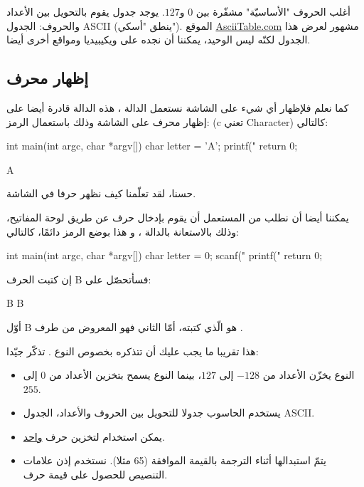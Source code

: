 أغلب الحروف "الأساسيّة" مشفّرة بين $0$ و$127$. يوجد جدول يقوم بالتحويل بين الأعداد والحروف: الجدول
\textenglish{ASCII}
(ينطق "أسكي"). الموقع
\href{http://www.asciitable.com/}{\textenglish{AsciiTable.com}}
مشهور لعرض هذا الجدول لكنّه ليس الوحيد، يمكننا أن نجده على ويكيبيديا ومواقع أخرى أيضا.

\subsection{إظهار محرف}

كما نعلم فلإظهار أي شيء على الشاشة نستعمل الدالة
،
هذه الدالة قادرة أيضا على إظهار محرف على الشاشة وذلك باستعمال الرمز:
(\textenglish{c} تعني \textenglish{Character})
كالتالي:

\begin{Csource}
int main(int argc, char *argv[])
{
	char letter = 'A';
	printf("%
	return 0;
}
\end{Csource}

\begin{Console}
A
\end{Console}

حسنا، لقد تعلّمنا كيف نظهر حرفا في الشاشة.

يمكننا أيضا أن نطلب من المستعمل أن يقوم بإدخال حرف عن طريق لوحة المفاتيح، وذلك بالاستعانة بالدالة
،
و هذا بوضع الرمز
دائمًا، كالتالي:

\begin{Csource}
int main(int argc, char *argv[])
{
	char letter = 0;
	scanf("%
	printf("%
	return 0;
}
\end{Csource}

إن كتبت الحرف
\textenglish{B}
فسأتحصّل على:

\begin{Console}
B
B
\end{Console}
أوّل
\textenglish{B}
هو الّذي كتبته، أمّا الثاني فهو المعروض من طرف
.

هذا تقريبا ما يجب عليك أن تتذكره بخصوص النوع .
تذكّر جيّدا:

\begin{itemize}
  \item  النوع
يخزّن الأعداد من
$-128$
إلى
$127$،
بينما النوع
يسمح بتخزين الأعداد من
$0$
إلى
$255$.
  \item يستخدم الحاسوب جدولا للتحويل بين الحروف والأعداد، الجدول
\textenglish{ASCII}.
  \item يمكن استخدام
لتخزين حرف
\underline{واحد}.
  \item {}
يتمّ استبدالها أثناء الترجمة بالقيمة الموافقة (65 مثلا). نستخدم إذن علامات التنصيص للحصول على قيمة حرف.
\end{itemize}

